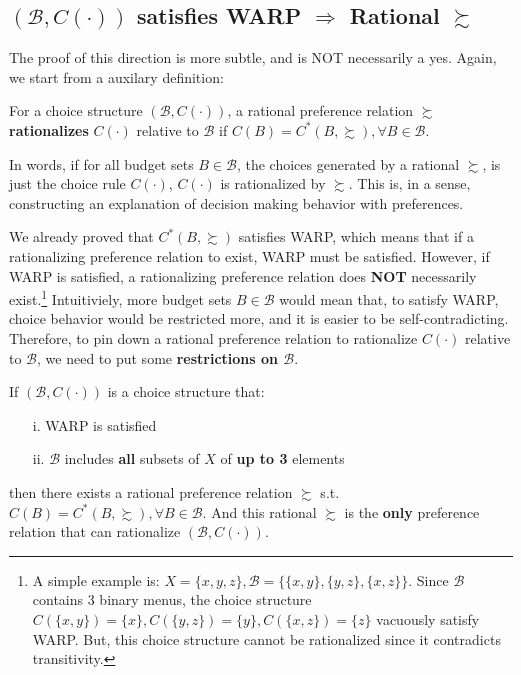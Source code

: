 \subsection*{$(\mathcal{B},C(\cdot))$ satisfies WARP $\Rightarrow$ Rational $\succsim$}
The proof of this direction is more subtle, and is NOT necessarily a yes. Again, we start from a auxilary definition:
\begin{definition}\label{def_rationalize_choice}
    For a choice structure $(\mathcal{B},C(\cdot))$, a rational preference relation $\succsim$ \textbf{rationalizes} $C(\cdot)$ relative to $\mathcal{B}$ if $C(B)=C^*(B,\succsim), \forall B\in\mathcal{B}$.
\end{definition}

In words, if for all budget sets $B\in\mathcal{B}$, the choices generated by a rational $\succsim$, is just the choice rule $C(\cdot)$, $C(\cdot)$ is rationalized by $\succsim$. This is, in a sense, constructing an explanation of decision making behavior with preferences.

We already proved that $C^*(B,\succsim)$ satisfies WARP, which means that if a rationalizing preference relation to exist, WARP must be satisfied. However, if WARP is satisfied, a rationalizing preference relation does \textbf{NOT} necessarily exist.\footnote{A simple example is: $X=\{x,y,z\},\mathcal{B}=\{\{x,y\},\{y,z\},\{x,z\}\}$. Since $\mathcal{B}$ contains 3 binary menus, the choice structure $C(\{x,y\})=\{x\},C(\{y,z\})=\{y\},C(\{x,z\})=\{z\}$ vacuously satisfy WARP. But, this choice structure cannot be rationalized since it contradicts transitivity.}
Intuitiviely, more budget sets $B\in\mathcal{B}$ would mean that, to satisfy WARP, choice behavior would be restricted more, and it is easier to be self-contradicting. Therefore, to pin down a rational preference relation to rationalize $C(\cdot)$ relative to $\mathcal{B}$, we need to put some \textbf{restrictions on $\mathcal{B}$}.

\begin{theorem}\label{theorem_rationalizing_exist}
    If $(\mathcal{B},C(\cdot))$ is a choice structure that:
    \begin{enumerate}
        \item[i.] WARP is satisfied
        \item[ii.] $\mathcal{B}$ includes \textbf{all} subsets of $X$ of \textbf{up to 3} elements 
    \end{enumerate}
    then there exists a rational preference relation $\succsim$ s.t. $C(B)=C^*(B,\succsim),\forall B\in\mathcal{B}$. And this rational $\succsim$ is the \textbf{only} preference relation that can rationalize $(\mathcal{B},C(\cdot))$.
\end{theorem}

